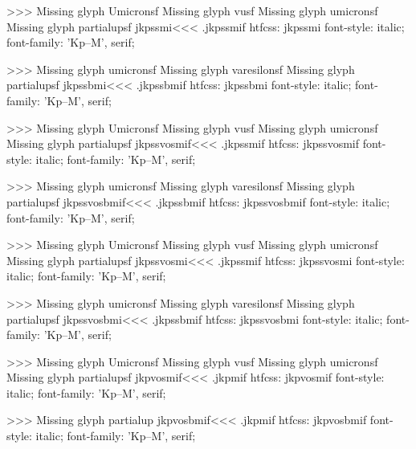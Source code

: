 >>>
Missing glyph	Umicronsf
Missing glyph	vusf
Missing glyph	umicronsf
Missing glyph	partialupsf
\<jkpssmi\><<<
.jkpssmif
htfcss:  jkpssmi  font-style: italic; font-family: 'Kp--M', serif;

>>>
Missing glyph	umicronsf
Missing glyph	varesilonsf
Missing glyph	partialupsf
\<jkpssbmi\><<<
.jkpssbmif
htfcss:  jkpssbmi  font-style: italic; font-family: 'Kp--M', serif;

>>>
Missing glyph	Umicronsf
Missing glyph	vusf
Missing glyph	umicronsf
Missing glyph	partialupsf
\<jkpssvosmif\><<<
.jkpssmif
htfcss:  jkpssvosmif  font-style: italic; font-family: 'Kp--M', serif;

>>>
Missing glyph	umicronsf
Missing glyph	varesilonsf
Missing glyph	partialupsf
\<jkpssvosbmif\><<<
.jkpssbmif
htfcss:  jkpssvosbmif  font-style: italic; font-family: 'Kp--M', serif;

>>>
Missing glyph	Umicronsf
Missing glyph	vusf
Missing glyph	umicronsf
Missing glyph	partialupsf
\<jkpssvosmi\><<<
.jkpssmif
htfcss:  jkpssvosmi  font-style: italic; font-family: 'Kp--M', serif;

>>>
Missing glyph	umicronsf
Missing glyph	varesilonsf
Missing glyph	partialupsf
\<jkpssvosbmi\><<<
.jkpssbmif
htfcss:  jkpssvosbmi  font-style: italic; font-family: 'Kp--M', serif;

>>>
Missing glyph	Umicronsf
Missing glyph	vusf
Missing glyph	umicronsf
Missing glyph	partialupsf
\<jkpvosmif\><<<
.jkpmif
htfcss:  jkpvosmif  font-style: italic; font-family: 'Kp--M', serif;

>>>
Missing glyph	partialup
\<jkpvosbmif\><<<
.jkpmif
htfcss:  jkpvosbmif  font-style: italic; font-family: 'Kp--M', serif;

